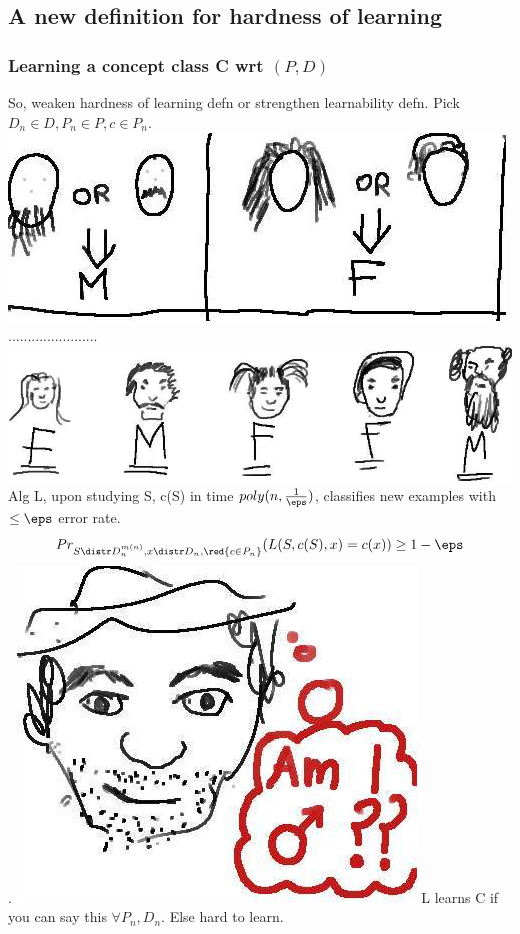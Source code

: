 \documentclass{beamer}
\begin{document}
\subsection{A new definition for hardness of learning}
\begin{frame}
\frametitle{Learning a concept class C wrt $(P, D)$}
\begin{itemize}
\pitem So, weaken hardness of learning defn or strengthen learnability defn.
\pitem Pick $D_{n} \in D, P_{n} \in P, c \in P_{n}$.\\ \includegraphics[scale=0.15]{images/concepts.jpg}.......................
\includegraphics[scale=0.15]{images/classifiedFaces.jpg}
\pitem Alg L, upon studying S, c(S) in time $poly(n, \frac{1}{\eps})$, classifies new examples with $\leq \eps$ error rate.
\pitem $$Pr_{S \distr D_{n}^{m(n)}, x \distr D_{n}, \red{c \in P_{n}}}(L(S, c(S), x) = c(x)) \geq 1 - \eps$$.
\includegraphics[scale=0.065]{images/maleFace.jpg}
\pitem L learns C if you can say this $\forall P_{n}, D_{n}$.
\pitem Else hard to learn.
\end{itemize}
\end{frame}
\end{document}
